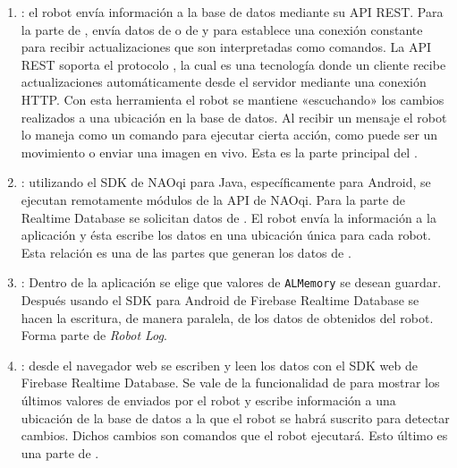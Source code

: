 \begin{enumerate}
    \item{}: el robot envía información
a la base de datos mediante su API REST.
Para la parte de , envía datos de  o de 
y para  establece una conexión constante para recibir
actualizaciones que son interpretadas como comandos.
La API REST soporta el protocolo
, la cual es una
tecnología donde un cliente recibe actualizaciones automáticamente desde el
servidor mediante una conexión HTTP. Con esta herramienta el robot se mantiene
«escuchando» los cambios realizados a una ubicación en la base de datos. Al
recibir un mensaje el robot lo maneja como un comando para ejecutar cierta
acción, como puede ser un movimiento o enviar una imagen en vivo. Esta es la parte principal del .

\item{}: utilizando el SDK de NAOqi para Java,
específicamente para Android, se ejecutan remotamente módulos de la API de NAOqi.
Para la parte de Realtime Database se solicitan datos de . El robot
envía la información a la aplicación y ésta escribe los datos en una ubicación
única para cada robot. Esta relación es una de las partes que generan los datos
de .

\item{}: Dentro de la aplicación se elige
que valores de \texttt{ALMemory}
se desean guardar. Después
usando
el SDK para Android de Firebase Realtime Database se hacen la
escritura, de manera paralela,
de los datos de 
obtenidos del robot. Forma parte
de \textit{Robot Log}.

\item {}: desde el navegador web se escriben y
leen los datos con el SDK web de Firebase Realtime Database. Se vale de
la funcionalidad de  para mostrar los últimos valores de 
enviados por el robot y escribe información a una ubicación de la base de
datos a la que el robot se habrá suscrito para detectar cambios. Dichos cambios
son comandos que el robot ejecutará. Esto último es una parte de
.
\end{enumerate}

